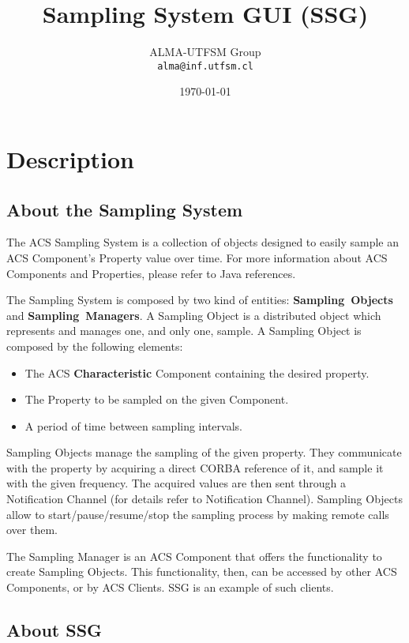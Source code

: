 \documentclass[letter, 10pt]{article}
\begin{document}
\title{Sampling System GUI (SSG)}
\author{ALMA-UTFSM Group\\\texttt{alma@inf.utfsm.cl}}
\date{\today}
\maketitle

\section{Description}

\subsection{About the Sampling System}
The ACS Sampling System is a collection of objects designed to easily sample an
ACS Component's Property value over time. For more information about ACS
Components and Properties, please refer to Java references.

The Sampling System is composed by two kind of entities: \textbf{Sampling\ Objects}
and \textbf{Sampling\ Managers}. A Sampling Object is a distributed object which
represents and manages one, and only one, sample. A Sampling Object is composed
by the following elements:

\begin{itemize}
    \item The ACS \textbf{Characteristic} Component containing the desired property.
    \item The Property to be sampled on the given Component.
    \item A period of time between sampling intervals.
\end{itemize}

Sampling Objects manage the sampling of the given property. They communicate
with the property by acquiring a direct CORBA reference of it, and sample it
with the given frequency. The acquired values are then sent through a
Notification Channel (for details refer to Notification Channel).
Sampling Objects allow to start/pause/resume/stop the sampling process by
making remote calls over them.

The Sampling Manager is an ACS Component that offers the functionality to create
Sampling Objects. This functionality, then, can be accessed by other ACS
Components, or by ACS Clients. SSG is an example of such clients.

\subsection{About SSG}
\end{document}
